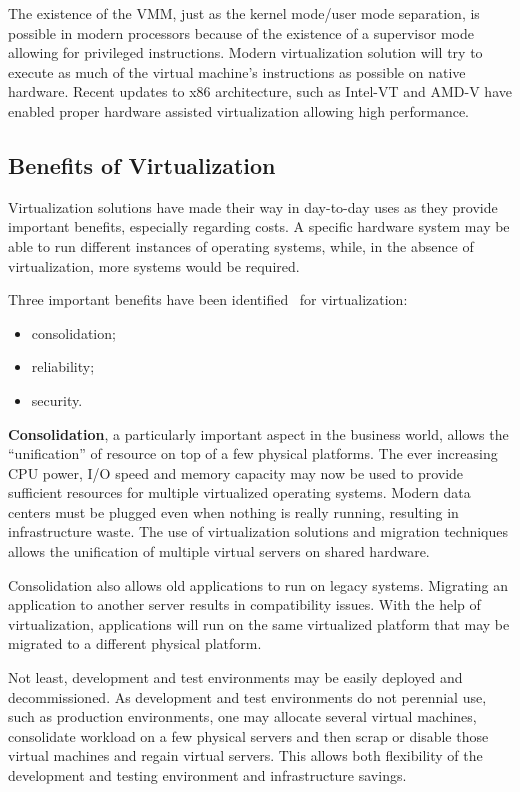 The existence of the VMM, just as the kernel mode/user mode separation, is
possible in modern processors because of the existence of a supervisor mode
allowing for privileged instructions. Modern virtualization solution will try
to execute as much of the virtual machine's instructions as possible on native
hardware. Recent updates to x86 architecture, such as Intel-VT and AMD-V have
enabled proper hardware assisted virtualization allowing high performance.

\subsection{Benefits of Virtualization}

Virtualization solutions have made their way in day-to-day uses as they
provide important benefits, especially regarding costs. A specific hardware
system may be able to run different instances of operating systems, while, in
the absence of virtualization, more systems would be required.

Three important benefits have been identified~\cite{best-damn-virt} for
virtualization:

\begin{itemize}
  \item consolidation;
  \item reliability;
  \item security.
\end{itemize}

\textbf{Consolidation}, a particularly important aspect in the business world,
allows the ``unification'' of resource on top of a few physical platforms. The
ever increasing CPU power, I/O speed and memory capacity may now be used to
provide sufficient resources for multiple virtualized operating systems.
Modern data centers must be plugged even when nothing is really running,
resulting in infrastructure waste. The use of virtualization solutions and
migration techniques allows the unification of multiple virtual servers on
shared hardware.

Consolidation also allows old applications to run on legacy systems. Migrating
an application to another server results in compatibility issues. With the
help of virtualization, applications will run on the same virtualized platform
that may be migrated to a different physical platform.

Not least, development and test environments may be easily deployed and
decommissioned. As development and test environments do not perennial use, such
as production environments, one may allocate several virtual machines,
consolidate workload on a few physical servers and then scrap or disable those
virtual machines and regain virtual servers. This allows both flexibility of
the development and testing environment and infrastructure savings.

